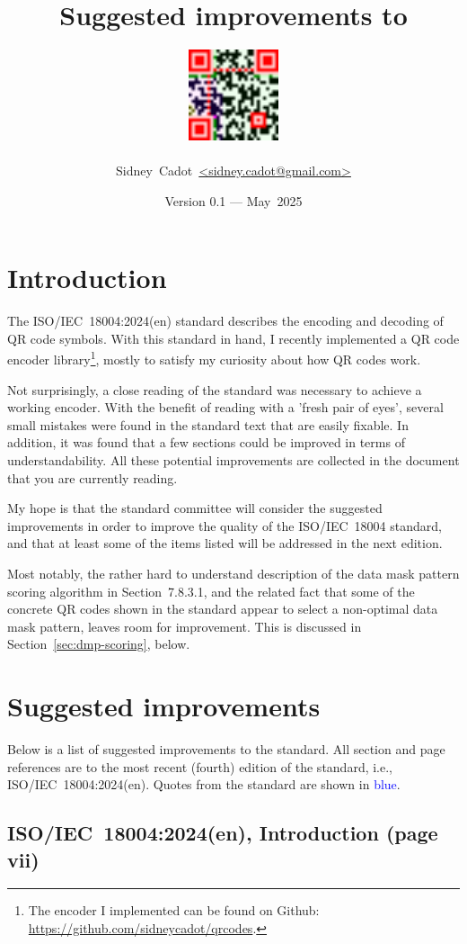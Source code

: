 \documentclass[a4paper,twoside]{article}
\title{Suggested improvements to \standard}
\author{\includegraphics[width=0.2\textwidth]{images/email.png} \\ \\ Sidney~Cadot~\url{<sidney.cadot@gmail.com>}}
\date{Version 0.1 --- May~2025}
\newcommand{\shortstandard}{ISO/IEC~18004}
\newcommand{\standard}{\shortstandard:2024(en)}
\begin{document}
%
%
\maketitle
%
%
\section{Introduction}

The \standard{} standard describes the encoding and decoding of QR code symbols. With this standard in hand,
I recently implemented a QR code encoder library\footnote{The encoder I implemented can be found on Github:
\url{https://github.com/sidneycadot/qrcodes}.}, mostly to satisfy my curiosity about how QR codes work.

Not surprisingly, a close reading of the standard was necessary to achieve a working encoder. With the benefit
of reading with a 'fresh pair of eyes', several small mistakes were found in the standard text that are easily
fixable. In addition, it was found that a few sections could be improved in terms of understandability. All
these potential improvements are collected in the document that you are currently reading.

My hope is that the standard committee will consider the suggested improvements in order to improve the
quality of the \shortstandard{} standard, and that at least some of the items listed will be addressed in
the next edition.

Most notably, the rather hard to understand description of the data mask pattern scoring algorithm in
Section~7.8.3.1, and the related fact that some of the concrete QR codes shown in the standard appear to
select a non-optimal data mask pattern, leaves room for improvement. This is discussed in
Section~\ref{sec:dmp-scoring}, below.

\section{Suggested improvements}

Below is a list of suggested improvements to the standard. All section and page references are to the most recent (fourth)
edition of the standard, i.e., \standard. Quotes from the standard are shown in \textcolor{blue}{blue}.

\subsection{\standard, Introduction (page vii)}
\end{document}
